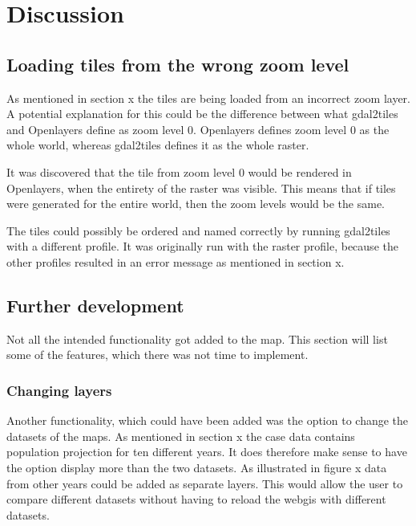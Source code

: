\chapter{Discussion}


\section{Loading tiles from the wrong zoom level}

As mentioned in section x the tiles are being loaded from an incorrect zoom layer. A potential explanation for this could be the difference between what gdal2tiles and Openlayers define as zoom level 0. Openlayers defines zoom level 0 as the whole world, whereas gdal2tiles defines it as the whole raster. 

It was discovered that the tile from zoom level 0 would be rendered in Openlayers, when the entirety of the raster was visible. This means that if tiles were generated for the entire world, then the zoom levels would be the same. 

The tiles could possibly be ordered and named correctly by running gdal2tiles with a different profile.  It was originally run with the raster profile, because the other profiles resulted in an error message as mentioned in section x. 


\section{Further development}
Not all the intended functionality got added to the map. This section will list some of the features, which there was not time to implement. 
%





\subsection{Changing layers}
Another functionality, which could have been added was the option to change the datasets of the maps. As mentioned in section x the case data contains population projection for ten different years. It does therefore make sense to have the option display more than the two datasets.  As illustrated in figure x data from other years could be added as separate layers. This would allow the user to compare different datasets without having to reload the webgis with different datasets.

